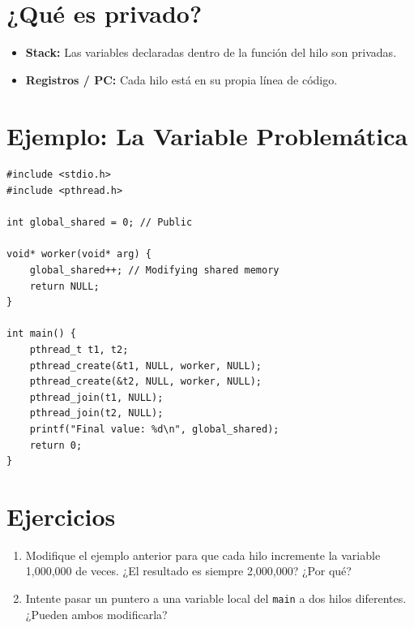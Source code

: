 \documentclass[12pt,a4paper]{article}
\begin{document}
\section{¿Qué es privado?}
\begin{itemize}
    \item \textbf{Stack:} Las variables declaradas dentro de la función del hilo son privadas.
    \item \textbf{Registros / PC:} Cada hilo está en su propia línea de código.
\end{itemize}

\section{Ejemplo: La Variable Problemática}
\begin{lstlisting}
#include <stdio.h>
#include <pthread.h>

int global_shared = 0; // Public

void* worker(void* arg) {
    global_shared++; // Modifying shared memory
    return NULL;
}

int main() {
    pthread_t t1, t2;
    pthread_create(&t1, NULL, worker, NULL);
    pthread_create(&t2, NULL, worker, NULL);
    pthread_join(t1, NULL);
    pthread_join(t2, NULL);
    printf("Final value: %d\n", global_shared);
    return 0;
}
\end{lstlisting}

\section{Ejercicios}
\begin{enumerate}
    \item Modifique el ejemplo anterior para que cada hilo incremente la variable 1,000,000 de veces. ¿El resultado es siempre 2,000,000? ¿Por qué?
    \item Intente pasar un puntero a una variable local del \texttt{main} a dos hilos diferentes. ¿Pueden ambos modificarla?
\end{enumerate}
\end{document}
